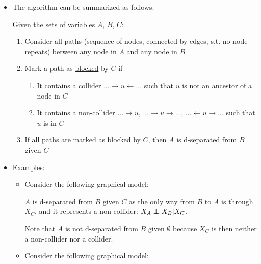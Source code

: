 \begin{itemize}
	\item The algorithm can be summarized as follows:
	\begin{tcolorbox}[colback=white!80!gray,colframe=gray!75!black,title=D-separation]
		Given the sets of variables $A$, $B$, $C$:
		\begin{enumerate}
			\item Consider all paths (sequence of nodes, connected by edges,  s.t. no node repeats) between any node in $A$ and any node in $B$
			\item Mark a path as \underline{blocked} by $C$ if
			\begin{enumerate}
				\item It contains a collider $...\rightarrow u \leftarrow ...$ such that $u$ is not an ancestor of a node in $C$
				\item It contains a non-collider $...\rightarrow u$, $...\rightarrow u \rightarrow ...$, $...\leftarrow u \rightarrow ...$ such that $u$ is in $C$
			\end{enumerate}
			\item If all paths are marked as blocked by $C$, then $A$ is d-separated from $B$ given $C$
		\end{enumerate}
	\end{tcolorbox}	
	\item \underline{Examples}: 
	\begin{itemize}
		\item Consider the following graphical model:
		\begin{figure}[ht!]
			\centering
		\end{figure}
	
		$A$ is d-separated from $B$ given $C$ as the only way from $B$ to $A$ is through $X_C$, and it represents a non-collider: $X_A\independent X_B|X_C$.
		
		Note that $A$ is not d-separated from $B$ given $\emptyset$ because $X_C$ is then neither a non-collider nor a collider.
		\item Consider the following graphical model:
		\begin{figure}[ht!]
			\centering
		\end{figure}
	

\end{itemize}
\end{itemize}
